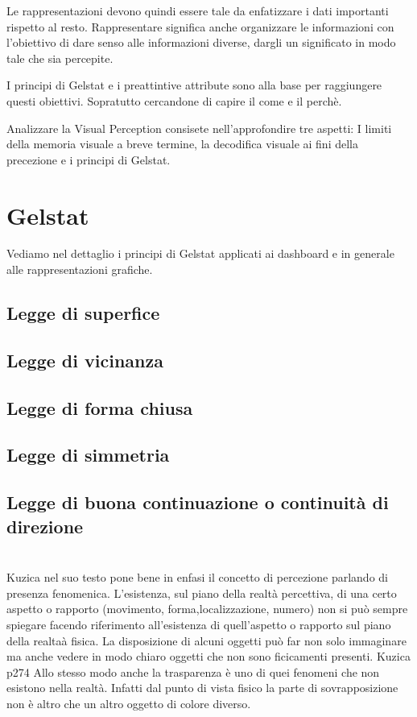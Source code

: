 \documentclass{ium}
\begin{document}
Le rappresentazioni devono quindi essere tale da enfatizzare i dati importanti rispetto al resto. Rappresentare significa anche organizzare le informazioni con l'obiettivo di dare senso alle informazioni diverse, dargli un significato in modo tale che sia percepite.

I principi di Gelstat e i preattintive attribute sono alla base per raggiungere questi obiettivi. Sopratutto cercandone di capire il come e il perchè.

Analizzare la Visual Perception consisete nell'approfondire tre aspetti: I limiti della memoria visuale a breve termine, la decodifica visuale ai fini della precezione e i principi di Gelstat.


\section{Gelstat}
Vediamo nel dettaglio i principi di Gelstat applicati ai dashboard e in generale alle rappresentazioni grafiche.
\subsection{Legge di superfice}
\subsection{Legge di vicinanza}
\subsection{Legge di forma chiusa}
\subsection{Legge di simmetria}
\subsection{Legge di buona continuazione o continuità di direzione}


\section{}

Kuzica nel suo testo pone bene in enfasi il concetto di percezione parlando di presenza fenomenica. 
L'esistenza, sul piano della realtà percettiva, di una certo aspetto o rapporto (movimento, forma,localizzazione, numero) non si può sempre spiegare facendo riferimento all'esistenza di quell'aspetto o rapporto sul piano della realtaà fisica.
La disposizione di alcuni oggetti può far non solo immaginare ma anche vedere in modo chiaro oggetti che non sono ficicamenti presenti. Kuzica p274
Allo stesso modo anche la trasparenza è uno di quei fenomeni che non esistono nella realtà. Infatti dal punto di vista fisico la parte di sovrapposizione non è altro che un altro oggetto di colore diverso.
\end{document}

